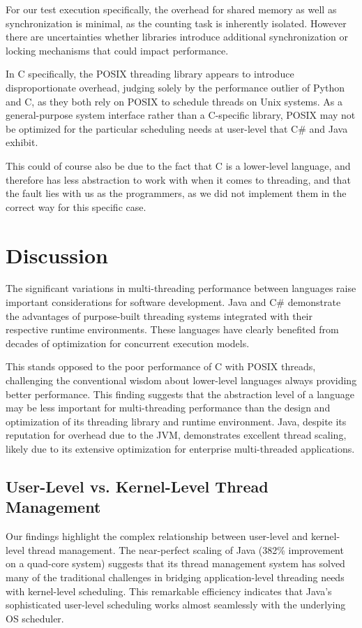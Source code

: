 \documentclass[12pt,a4paper]{article}
\begin{document}
For our test execution specifically, the overhead for shared memory as well as synchronization is minimal, as the counting task is inherently isolated. However there are uncertainties whether libraries introduce additional synchronization or locking mechanisms that could impact performance.

In C specifically, the POSIX threading library appears to introduce disproportionate overhead, judging solely by the performance outlier of Python and C, as they both rely on POSIX to schedule threads on Unix systems. As a general-purpose system interface rather than a C-specific library, POSIX may not be optimized for the particular scheduling needs at user-level that C\# and Java exhibit.

This could of course also be due to the fact that C is a lower-level language, and therefore has less abstraction to work with when it comes to threading, and that the fault lies with us as the programmers, as we did not implement them in the correct way for this specific case. 

\section{Discussion}

The significant variations in multi-threading performance between languages raise important considerations for software development. Java and C\# demonstrate the advantages of purpose-built threading systems integrated with their respective runtime environments. These languages have clearly benefited from decades of optimization for concurrent execution models.

This stands opposed to the poor performance of C with POSIX threads, challenging the conventional wisdom about lower-level languages always providing better performance. This finding suggests that the abstraction level of a language may be less important for multi-threading performance than the design and optimization of its threading library and runtime environment. Java, despite its reputation for overhead due to the JVM, demonstrates excellent thread scaling, likely due to its extensive optimization for enterprise multi-threaded applications.

\subsection{User-Level vs. Kernel-Level Thread Management}

Our findings highlight the complex relationship between user-level and kernel-level thread management. The near-perfect scaling of Java (382\% improvement on a quad-core system) suggests that its thread management system has solved many of the traditional challenges in bridging application-level threading needs with kernel-level scheduling. This remarkable efficiency indicates that Java's sophisticated user-level scheduling works almost seamlessly with the underlying OS scheduler.
\end{document}
